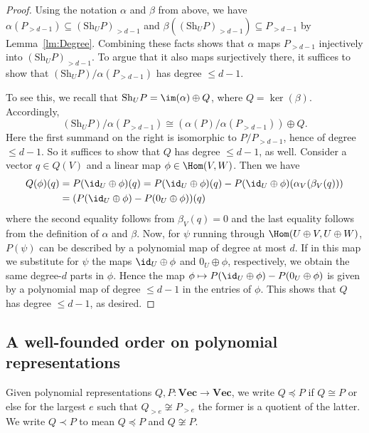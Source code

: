 \documentclass{amsart}
\renewcommand{\Vec}{\mathbf{Vec}}
\newcommand{\Sh}{\mathrm{Sh}}
\begin{document}
\begin{proof}
Using the notation $\alpha$ and $\beta$ from above, we have
$\alpha(P_{>d-1}) \subseteq (\Sh_U P)_{>d-1}$ and $\beta((\Sh_U P)_{>d-1})
\subseteq P_{>d-1}$ by Lemma~\ref{lm:Degree}.  Combining these facts shows
that $\alpha$ maps $P_{>d-1}$ injectively into $(\Sh_U P)_{>d-1}$. To
argue that it also maps surjectively there, it suffices to show that
$(\Sh_U P)/\alpha(P_{>d-1})$ has degree $\leq d-1$.

To see this, we recall that $\Sh_U P=\im(\alpha) \oplus Q$, where
$Q=\ker(\beta)$. Accordingly, 
\[ (\Sh_U P)/\alpha(P_{>d-1}) \cong (\alpha(P)/\alpha(P_{>d-1})) \oplus
Q. \]
Here the first summand on the right is isomorphic to $P/P_{>d-1}$, hence of degree
$\leq d-1$. So it suffices to show that $Q$ has degree $\leq d-1$,
as well. Consider a vector $q \in Q(V)$ and a linear map $\phi \in
\Hom(V,W)$. Then we have 
\begin{align*} 
Q(\phi)(q)&=P(\id_U \oplus \phi)(q)=P(\id_U \oplus \phi)(q) - 
P(\id_U \oplus \phi)(\alpha_V(\beta_V(q))) \\
&= (P(\id_U \oplus \phi)-P(0_U \oplus \phi))(q) 
\end{align*}
where the second equality follows from $\beta_V(q)=0$ and the last
equality follows from the definition of $\alpha$ and $\beta$. Now,
for $\psi$ running through $\Hom(U \oplus V,U \oplus W)$, $P(\psi)$ can be
described by a polynomial map of degree at most $d$. If in this map we
substitute for $\psi$ the maps $\id_U \oplus \phi$ and $0_U \oplus
\phi$, respectively, we obtain the same degree-$d$ parts in $\phi$. Hence the map 
$\phi \mapsto P(\id_U \oplus \phi)-P(0_U \oplus \phi)$ is given by a
polynomial map of degree $\leq d-1$ in the entries of $\phi$. This
shows that $Q$ has degree $\leq d-1$, as desired. 
\end{proof}

\subsection{A well-founded order on polynomial
representations} \label{ssec:Order}

\begin{de}
Given polynomial representations $Q,P: \Vec \to \Vec$, we write $Q \preceq P$
if $Q \cong P$ or else for the largest $e$ such that $Q_{>e} \not \cong
P_{>e}$ the former is a quotient of the latter. We write $Q \prec P$
to mean $Q \preceq P$ and $Q \not \cong P$.
\end{de}
\end{document}
